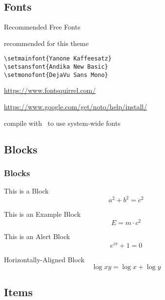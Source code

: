 \documentclass[compress]{beamer}
\begin{document}
\subsection{Fonts}

\begin{frame}[fragile]{Recommended Free Fonts}
  \begin{description}
  \item[Selected Fonts] recommended for this theme\\
    \begin{lstlisting}[basicstyle = \ttfamily\small]
\setmainfont{Yanone Kaffeesatz}
\setsansfont{Andika New Basic}
\setmonofont{DejaVu Sans Mono}
    \end{lstlisting}
  \item[Download] {\small \url{https://www.fontsquirrel.com/}}
  \item[Install Fonts] {\small \url{https://www.google.com/get/noto/help/install/}}
  \item[Compilation] compile with \XeLaTeX~to use system-wide fonts
  \end{description}

\end{frame}


\subsection{Blocks}

\begin{frame}
  \frametitle{Blocks}
  \begin{block}{This is a Block}
    \[
      a^2 + b^2 = c^2
    \]
  \end{block}
  \begin{exampleblock}{This is an Example Block}
    \[
      E = m \cdot c^{2}
    \]
  \end{exampleblock}
  \begin{alertblock}{This is an Alert Block}
    \[
      e^{i\pi} + 1 = 0
    \]
  \end{alertblock}

  \centering
  \begin{minipage}{1.0\linewidth}
    \begin{block}{Horizontally-Aligned Block}
      \[
        \log xy = \log x + \log y
      \]
    \end{block}
  \end{minipage}
\end{frame}

\subsection{Items}
\end{document}
